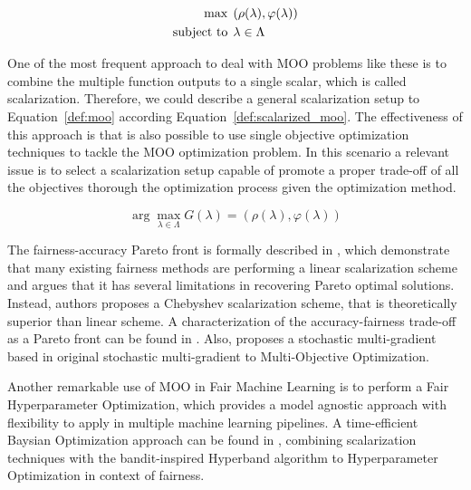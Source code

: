 \begin{align}\label{def:moo}
\max &\hspace{1ex} (\rho(\lambda), \varphi(\lambda)) \\
\text{subject to} &\hspace{1ex} \lambda\in\Lambda \nonumber
\end{align}

One of the most frequent approach to deal with MOO problems like these is to combine the multiple function outputs to a single scalar, which is called scalarization. Therefore, we could describe a general scalarization setup to Equation~\ref{def:moo} according Equation~\ref{def:scalarized_moo}. The effectiveness of this approach is that is also possible to use single objective optimization techniques to tackle the MOO optimization problem. In this scenario a relevant issue is to select a scalarization setup capable of promote a proper trade-off of all the objectives thorough the optimization process given the optimization method.

\begin{equation}\label{def:scalarized_moo}
\arg\max\limits_{\lambda\in\Lambda} G(\lambda) = (\rho(\lambda), \varphi(\lambda))
\end{equation}

The fairness-accuracy Pareto front is formally described in \cite{Wei2022}, which demonstrate that many existing fairness methods are performing a linear scalarization scheme and argues that it has several limitations in recovering Pareto optimal solutions. Instead, authors proposes a Chebyshev scalarization scheme, that is theoretically superior than linear scheme. A characterization of the accuracy-fairness trade-off as a Pareto front can be found in \cite{Liu2022}. Also, \cite{Mercier2018} proposes a stochastic multi-gradient based in original stochastic multi-gradient to Multi-Objective Optimization.

Another remarkable use of MOO in Fair Machine Learning is to perform a Fair Hyperparameter Optimization, which provides a model agnostic approach with flexibility to apply in multiple machine learning pipelines. A time-efficient Baysian Optimization approach can be found in \cite{Schmucker2020}, combining scalarization techniques with the bandit-inspired Hyperband \citep{Li2016} algorithm to Hyperparameter Optimization in context of fairness.


